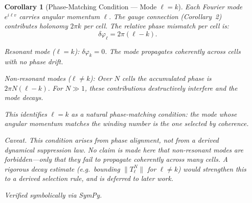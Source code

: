 \documentclass[12pt]{amsart}
\newtheorem{corollary}{Corollary}
\begin{document}
\begin{corollary}[Phase-Matching Condition --- Mode $\ell = k$]
Each Fourier mode $e^{i\ell v}$ carries angular momentum $\ell$. The gauge connection
(Corollary~2) contributes holonomy $2\pi k$ per cell. The relative phase mismatch per cell is:
\[
  \delta\varphi_\ell = 2\pi(\ell - k).
\]

\textit{Resonant mode} ($\ell = k$): $\delta\varphi_k = 0$. The mode propagates coherently
across cells with no phase drift.

\textit{Non-resonant modes} ($\ell \ne k$): Over $N$ cells the accumulated phase is
$2\pi N(\ell - k)$. For $N \gg 1$, these contributions destructively interfere and the mode
decays.

This identifies $\ell = k$ as a natural phase-matching condition: the mode whose angular
momentum matches the winding number is the one selected by coherence.

\textit{Caveat.} This condition arises from phase alignment, not from a derived dynamical
suppression law. No claim is made here that non-resonant modes are forbidden---only that they
fail to propagate coherently across many cells. A rigorous decay estimate (e.g.\ bounding
$\|T_\ell^N\|$ for $\ell \ne k$) would strengthen this to a derived selection rule, and is
deferred to later work.

Verified symbolically via SymPy.
\end{corollary}
\end{document}
